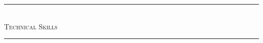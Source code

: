 \documentclass[10pt]{article}
\begin{document}



%


\vspace{-0.5em}


\vspace{-0.5em}
\begin{center}
{\noindent\rule[0.5ex]{\linewidth}{0.5pt}\\
\vspace{-0.5em}\large{\textsc{Technical Skills}}\\
\vspace{-0.25em}
\noindent\rule[0.5ex]{\linewidth}{0.5pt}}\\
\end{center}
\end{document}
